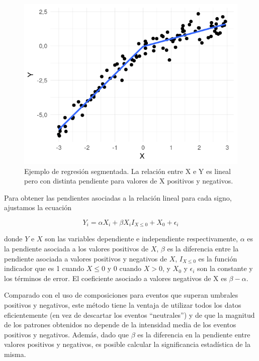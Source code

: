 \documentclass[12pt,oneside,a4paper]{reedthesis}
\begin{document}
\begin{figure}

{\centering \includegraphics{figures/30-sam/segmentada-ejemplo-1} 

}

\caption{Ejemplo de regresión segmentada. La relación entre X e Y es lineal pero con distinta pendiente para valores de X positivos y negativos.}\label{fig:segmentada-ejemplo}
\end{figure}



Para obtener las pendientes asociadas a la relación lineal para cada signo, ajustamos la ecuación

\[
Y_i = \alpha X_i + \beta X_iI_{X\le 0} + X_0 + \epsilon_i
\]

donde \(Y\) e \(X\) son las variables dependiente e independiente respectivamente, \(\alpha\) es la pendiente asociada a los valores positivos de \(X\), \(\beta\) es la diferencia entre la pendiente asociada a valores positivos y negativos de \(X\), \(I_{X\le 0}\) es la función indicador que es 1 cuando \(X\le0\) y 0 cuando \(X>0\), y \(X_0\) y \(\epsilon_i\) son la constante y los términos de error.
El coeficiente asociado a valores negativos de X es \(\beta - \alpha\).

Comparado con el uso de composiciones para eventos que superan umbrales positivos y negativos, este método tiene la ventaja de utilizar todos los datos eficientemente (en vez de descartar los eventos ``neutrales'') y de que la magnitud de los patrones obtenidos no depende de la intensidad media de los eventos positivos y negativos.
Además, dado que \(\beta\) es la diferencia en la pendiente entre valores positivos y negativos, es posible calcular la significancia estadística de la misma.
\end{document}
